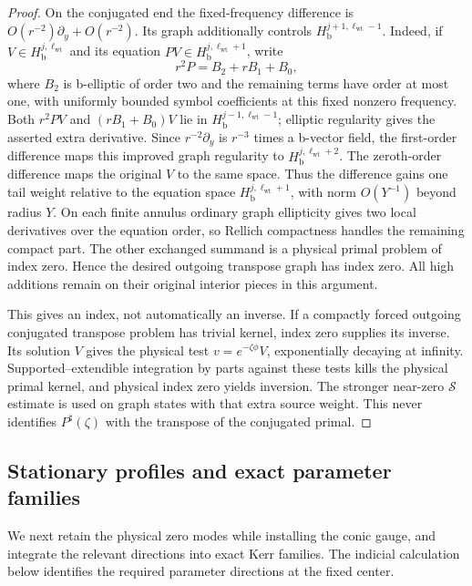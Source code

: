 \begin{proof}
On the conjugated end the fixed-frequency difference is
$O(r^{-2})\partial_y+O(r^{-2})$.  Its graph additionally controls
$H_{\mathrm b}^{j+1,\ell_{\mathrm{wt}}-1}$.  Indeed, if
$V\in H_{\mathrm b}^{j,\ell_{\mathrm{wt}}}$ and its equation
$PV\in H_{\mathrm b}^{j,\ell_{\mathrm{wt}}+1}$, write
\[
 r^2P=B_2+rB_1+B_0,
\]
where $B_2$ is b-elliptic of order two and the remaining terms
have order at most one, with uniformly bounded symbol
coefficients at this fixed nonzero frequency.  Both $r^2PV$
and $(rB_1+B_0)V$ lie in
$H_{\mathrm b}^{j-1,\ell_{\mathrm{wt}}-1}$; elliptic regularity
gives the asserted extra derivative.  Since
$r^{-2}\partial_y$ is $r^{-3}$ times a b-vector field, the
first-order difference maps this improved graph regularity to
$H_{\mathrm b}^{j,\ell_{\mathrm{wt}}+2}$.  The zeroth-order
difference maps the original $V$ to the same space.
Thus the difference gains one tail weight relative to the
equation space $H_{\mathrm b}^{j,\ell_{\mathrm{wt}}+1}$, with
norm $O(Y^{-1})$ beyond radius $Y$.  On each finite annulus
ordinary graph ellipticity gives two local derivatives over
the equation order, so Rellich compactness handles the
remaining compact part.
The other exchanged summand is a physical primal problem of
index zero.  Hence the desired outgoing transpose graph has
index zero.  All high additions remain on their original interior
pieces in this argument.

This gives an index, not automatically an inverse.  If a compactly
forced outgoing conjugated transpose problem has trivial kernel,
index zero supplies its inverse.  Its solution $V$ gives the
physical test $v=e^{-\zeta\phi}V$, exponentially decaying at
infinity.  Supported--extendible integration by parts against
these tests kills the physical primal kernel, and physical index
zero yields inversion.
The stronger near-zero $\mathcal S$ estimate is used on graph
states with that extra source weight.  This never identifies
$P^\sharp(\zeta)$ with the transpose of the conjugated primal.
\end{proof}

\subsection{Stationary profiles and exact parameter families}

We next retain the physical zero modes while installing the conic
gauge, and integrate the relevant directions into exact Kerr
families. The indicial calculation below identifies the required
parameter directions at the fixed center.

